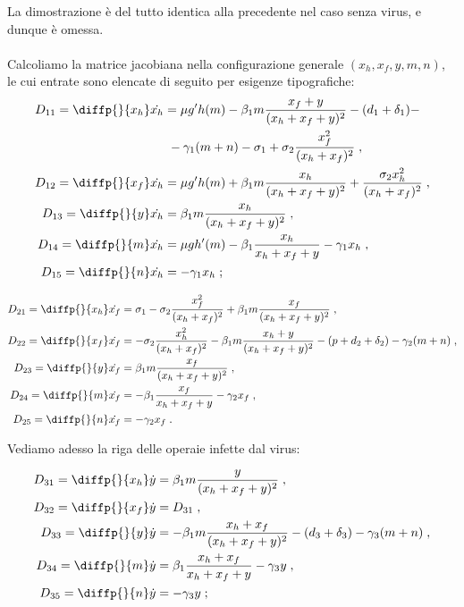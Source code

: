 La dimostrazione è del tutto identica alla precedente nel caso senza virus, e dunque è omessa.

\paragraph{}
Calcoliamo la matrice jacobiana nella configurazione generale $(x_h, x_f, y, m, n)$,
le cui entrate sono elencate di seguito per esigenze tipografiche:
\begin{equation}
\begin{split} %
D_{11} = \diffp{}{{x_h}} \dot{x_h} &=
    \mu g' h(m) - \beta_1 m \frac{x_f + y}{(x_h+x_f+y)^2} - (d_1 +\delta_1) - \\
    &~ - \gamma_1 (m+n) - \sigma_1 + \sigma_2 \frac{x_f^2}{(x_h+x_f)^2} \; , \\
D_{12} = \diffp{}{{x_f}} \dot{x_h} &= \mu g' h(m) + \beta_1 m \frac{x_h}{(x_h+x_f+y)^2} +
    \frac{\sigma_2 x_h^2}{(x_h+x_f)^2} \; , \\
D_{13} = \diffp{}{{y}} \dot{x_h} &= \beta_1 m \frac{x_h}{(x_h+x_f+y)^2} \; , \\
D_{14} = \diffp{}{m} \dot{x_h} &= \mu g h'(m) - \beta_1 \frac{x_h}{x_h+x_f+y} - \gamma_1 x_h \; , \\
D_{15} = \diffp{}{n} \dot{x_h} &= -\gamma_1 x_h \; ;
\end{split}
\end{equation}

\begin{equation} %
\begin{split}
D_{21} = \diffp{}{{x_h}} \dot{x_f} &= \sigma_1 - \sigma_2 \frac{x_f^2}{(x_h+x_f)^2} +
    \beta_1 m \frac{x_f}{(x_h+x_f+y)^2} \; , \\
D_{22} = \diffp{}{{x_f}} \dot{x_f} &= -\sigma_2 \frac{x_h^2}{(x_h+x_f)^2} - \beta_1 m \frac{x_h+y}{(x_h+x_f+y)^2}
    - (p + d_2 + \delta_2) - \gamma_2 (m+n) \; , \\
D_{23} = \diffp{}{y} \dot{x_f} &= \beta_1 m \frac{x_f}{(x_h+x_f+y)^2} \; , \\
D_{24} = \diffp{}{m} \dot{x_f} &= -\beta_1 \frac{x_f}{x_h+x_f+y} - \gamma_2 x_f \; , \\
D_{25} = \diffp{}{n} \dot{x_f} &= -\gamma_2 x_f \; .
\end{split}
\end{equation}

Vediamo adesso la riga delle operaie infette dal virus:

\begin{equation} %
\begin{split}
D_{31} = \diffp{}{{x_h}} \dot{y} &= \beta_1 m \frac{y}{(x_h+x_f+y)^2} \; , \\
D_{32} = \diffp{}{{x_f}} \dot{y} &= D_{31} \; , \\
D_{33} = \diffp{}{y} \dot{y} &= - \beta_1 m \frac{x_h+x_f}{(x_h+x_f+y)^2} - (d_3 + \delta_3) - \gamma_3(m+n) \; , \\
D_{34} = \diffp{}{m} \dot{y} &= \beta_1 \frac{x_h+x_f}{x_h+x_f+y} - \gamma_3 y \; , \\
D_{35} = \diffp{}{n} \dot{y} &= -\gamma_3 y \; ;
\end{split}
\end{equation}

